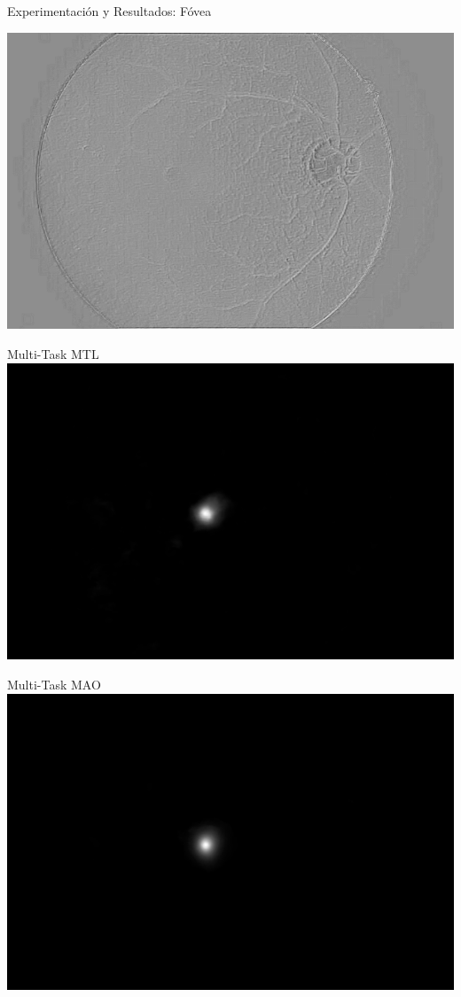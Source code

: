 \documentclass[xcolor=dvipsnames,table]{beamer}
\begin{document}
\begin{frame}{Experimentación y Resultados: Fóvea}
\begin{minipage}[b]{0.13\textwidth}
		\includegraphics[width=\linewidth]{my_images/video/FOVEAUNETMAO.jpg}
	\end{minipage}\hfill
	\begin{minipage}[b]{0.13\textwidth}
		\centering
		Multi-Task MTL\\[0.2cm]
		\includegraphics[width=\linewidth]{my_images/video/FOVEATASKMTL.jpg}
	\end{minipage}\hfill
	\begin{minipage}[b]{0.13\textwidth}
		\centering
		Multi-Task MAO\\[0.2cm]
		\includegraphics[width=\linewidth]{my_images/video/FOVEATASKMAO.jpg}

\end{minipage}
\end{frame}
\end{document}
